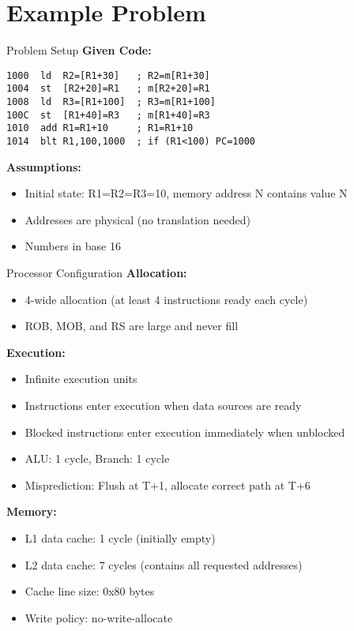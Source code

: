 \documentclass[aspectratio=169,12pt]{beamer}
\begin{document}
\section{Example Problem}

\begin{frame}[fragile]{Problem Setup}
\textbf{Given Code:}
\begin{lstlisting}[basicstyle=\footnotesize\ttfamily]
1000  ld  R2=[R1+30]   ; R2=m[R1+30]
1004  st  [R2+20]=R1   ; m[R2+20]=R1
1008  ld  R3=[R1+100]  ; R3=m[R1+100]
100C  st  [R1+40]=R3   ; m[R1+40]=R3
1010  add R1=R1+10     ; R1=R1+10
1014  blt R1,100,1000  ; if (R1<100) PC=1000
\end{lstlisting}

\textbf{Assumptions:}
\begin{itemize}
    \item Initial state: R1=R2=R3=10, memory address N contains value N
    \item Addresses are physical (no translation needed)
    \item Numbers in base 16
\end{itemize}
\end{frame}

\begin{frame}{Processor Configuration}
\textbf{Allocation:}
\begin{itemize}
    \item 4-wide allocation (at least 4 instructions ready each cycle)
    \item ROB, MOB, and RS are large and never fill
\end{itemize}

\textbf{Execution:}
\begin{itemize}
    \item Infinite execution units
    \item Instructions enter execution when data sources are ready
    \item Blocked instructions enter execution immediately when unblocked
    \item ALU: 1 cycle, Branch: 1 cycle
    \item Misprediction: Flush at T+1, allocate correct path at T+6
\end{itemize}

\textbf{Memory:}
\begin{itemize}
    \item L1 data cache: 1 cycle (initially empty)
    \item L2 data cache: 7 cycles (contains all requested addresses)
    \item Cache line size: 0x80 bytes
    \item Write policy: no-write-allocate
\end{itemize}
\end{frame}
\end{document}
